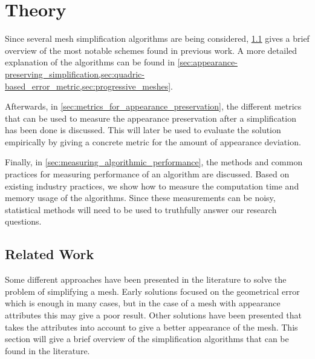 

\chapter{Theory} \label{ch:theory}
Since several mesh simplification algorithms are being considered, \cref{sec:related_work} gives a brief overview of the most notable schemes found in previous work. A more detailed explanation of the algorithms can be found in \cref{sec:appearance-preserving_simplification,sec:quadric-based_error_metric,sec:progressive_meshes}.

Afterwards, in \cref{sec:metrics_for_appearance_preservation}, the different metrics that can be used to measure the appearance preservation after a simplification has been done is discussed. This will later be used to evaluate the solution empirically by giving a concrete metric for the amount of appearance deviation.

Finally, in \cref{sec:measuring_algorithmic_performance}, the methods and common practices for measuring performance of an algorithm are discussed. Based on existing industry practices, we show how to measure the computation time and memory usage of the algorithms. Since these measurements can be noisy, statistical methods will need to be used to truthfully answer our research questions.

\section{Related Work} \label{sec:related_work}
Some different approaches have been presented in the literature to solve the problem of simplifying a mesh. Early solutions focused on the geometrical error which is enough in many cases, but in the case of a mesh with appearance attributes this may give a poor result. Other solutions have been presented that takes the attributes into account to give a better appearance of the mesh. This section will give a brief overview of the simplification algorithms that can be found in the literature.

